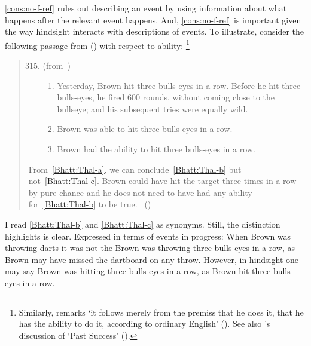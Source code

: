 \begin{note}
  \noindent%
  \autoref{cons:no-f-ref} rules out describing an event by using information about what happens after the relevant event happens.
  And, \autoref{cons:no-f-ref} is important given the way hindsight interacts with descriptions of events.
  To illustrate, consider the following passage from \citeauthor{Bhatt:2008aa} (\citeyear{Bhatt:2008aa}) with respect to ability:%
  \footnote{
    Similarly, \citeauthor{Austin:1961vz} remarks `it follows merely from the premiss that he does it, that he has the ability to do it, according to ordinary English' (\citeyear[175]{Austin:1961vz}).
    See also \citeauthor{Boylan:2020aa}'s discussion of `Past Success' (\citeyear[\S1.1]{Boylan:2020aa}).
  }
  \begin{quote}
    \begin{enumerate}[label=(\arabic*)]
      \setcounter{enumi}{314}
    \item
      (from~\cite{Thalberg:1969ta})
      \begin{enumerate}[label=\alph*., ref=(315\alph*)]
      \item
        \label{Bhatt:Thal-a}
        Yesterday, Brown hit three bulls-eyes in a row.
        Before he hit three bulls-eyes, he fired 600 rounds, without coming close to the bullseye; and his subsequent tries were equally wild.
      \item
        \label{Bhatt:Thal-b}
        Brown was able to hit three bulls-eyes in a row.
      \item
        \label{Bhatt:Thal-c}
        Brown had the ability to hit three bulls-eyes in a row.
      \end{enumerate}
    \end{enumerate}
    From~\ref{Bhatt:Thal-a}, we can conclude~\ref{Bhatt:Thal-b} but not~\ref{Bhatt:Thal-c}.
    Brown could have hit the target three times in a row by pure chance and he does not need to have had any ability for~\ref{Bhatt:Thal-b} to be true.\newline
    \mbox{ }\hfill\mbox{(\citeyear[167]{Bhatt:2008aa})}
  \end{quote}
  I read \ref{Bhatt:Thal-b} and \ref{Bhatt:Thal-c} as synonyms.
  Still, the distinction \citeauthor{Bhatt:2008aa} highlights is clear.
  Expressed in terms of events in progress:
  When Brown was throwing darts it was not the Brown was throwing three bulls-eyes in a row, as Brown may have missed the dartboard on any throw.
  However, in hindsight one may say Brown was hitting three bulls-eyes in a row, as Brown hit three bulls-eyes in a row.


\end{note}
